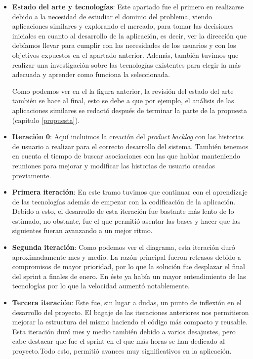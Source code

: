 \begin{itemize}
	\item \textbf{Estado del arte y tecnologías}: Este apartado fue el primero en realizarse debido a la necesidad de estudiar el dominio del problema, viendo aplicaciones similares y explorando el mercado, para tomar las decisiones iniciales en cuanto al desarrollo de la aplicación, es decir, ver la dirección que debíamos llevar para cumplir con las necesidades de los usuarios y con los objetivos expuestos en el apartado anterior. Además, también tuvimos que realizar una investigación sobre las tecnologías existentes para elegir la más adecuada y aprender como funciona la seleccionada.
	
	Como podemos ver en el la figura anterior, la revisión del estado del arte también se hace al final, esto se debe a que por ejemplo, el análisis de las aplicaciones similares se redactó después de terminar la parte de la propuesta (capítulo \ref{propuesta}). 
	
	\item \textbf{Iteración 0}: Aquí incluimos la creación del \textit{product backlog} con las historias de usuario a realizar para el correcto desarrollo del sistema. También tenemos en cuenta el tiempo de buscar asociaciones con las que hablar manteniendo reuniones para mejorar y modificar las historias de usuario creadas previamente.
	
	\item \textbf{Primera iteración}: En este tramo tuvimos que continuar con el aprendizaje de las tecnologías además de empezar con la codificación de la aplicación. Debido a esto, el desarrollo de esta iteración fue bastante más lento de lo estimado, no obstante, fue el que permitió asentar las bases y hacer que las siguientes fueran avanzando a un mejor ritmo.
	
	\item \textbf{Segunda iteración}: Como podemos ver el diagrama, esta iteración duró aproximadamente mes y medio. La razón principal fueron retrasos debido a compromisos de mayor prioridad, por lo que la solución fue desplazar el final del sprint a finales de enero. En éste ya había un mayor entendimiento de las tecnologías por lo que la velocidad aumentó notablemente.
	
	\item \textbf{Tercera iteración}: Este fue, sin lugar a dudas, un punto de inflexión en el desarrollo del proyecto. El bagaje de las iteraciones anteriores nos permitieron mejorar la estructura del mismo haciendo el código más compacto y reusable. Esta iteración duró mes y medio también debido a varios desajustes, pero cabe destacar que fue el sprint en el que más horas se han dedicado al proyecto.Todo esto, permitió avances muy significativos en la aplicación.
	

\end{itemize}
